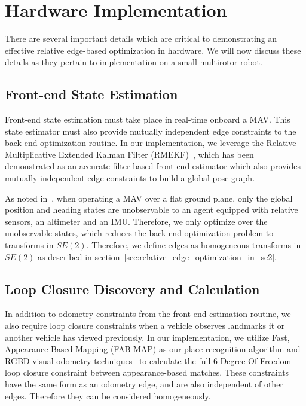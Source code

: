 
\section{Hardware Implementation}
There are several important details which are critical to demonstrating an effective relative edge-based optimization in hardware.  We will now discuss these details as they pertain to implementation on a small multirotor robot.

\subsection{Front-end State Estimation}
Front-end state estimation must take place in real-time onboard a MAV. This state estimator must also provide mutually independent edge constraints to the back-end optimization routine.  In our implementation, we leverage the Relative Multiplicative Extended Kalman Filter (RMEKF)~\cite{Koch2017}, which has been demonstrated as an accurate filter-based front-end estimator which also provides mutually independent edge constraints to build a global pose graph.

As noted in~\cite{Wheeler2017a}, when operating a MAV over a flat ground plane, only the global position and heading states are unobservable to an agent equipped with relative sensors, an altimeter and an IMU.  Therefore, we only optimize over the unobservable states, which reduces the back-end optimization problem to transforms in $SE(2)$.  Therefore, we define edges as homogeneous transforms in $SE(2)$ as described in section~\ref{sec:relative_edge_optimization_in_se2}.

\subsection{Loop Closure Discovery and Calculation}
In addition to odometry constraints from the front-end estimation routine, we also require loop closure constraints when a vehicle observes landmarks it or another vehicle has viewed previously.  In our implementation, we utilize Fast, Appearance-Based Mapping (FAB-MAP) as our place-recognition algorithm and RGBD visual odometry techniques~\cite{Leishman2013} to calculate the full 6-Degree-Of-Freedom loop closure constraint between appearance-based matches.  These constraints have the same form as an odometry edge, and are also independent of other edges.  Therefore they can be considered homogeneously.
